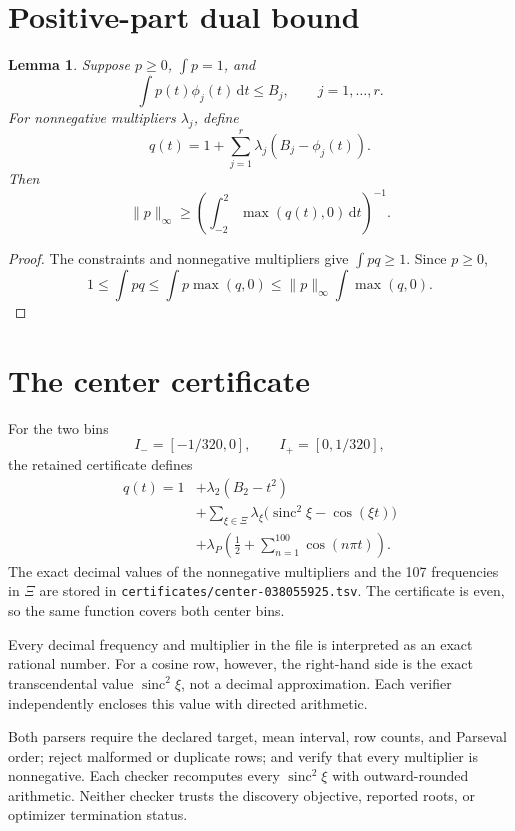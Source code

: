 \documentclass[11pt]{article}
\newtheorem{lemma}{Lemma}
\newcommand{\dd}{\,\mathrm{d}}
\DeclareMathOperator{\sinc}{sinc}
\begin{document}
\section{Positive-part dual bound}

\begin{lemma}\label{lem:dual}
Suppose $p\ge0$, $\int p=1$, and
\[
  \int p(t)\phi_j(t)\dd t\le B_j,\qquad j=1,\ldots,r.
\]
For nonnegative multipliers $\lambda_j$, define
\[
  q(t)=1+\sum_{j=1}^{r}\lambda_j(B_j-\phi_j(t)).
\]
Then
\[
  \|p\|_\infty\ge
  \left(\int_{-2}^{2}\max(q(t),0)\dd t\right)^{-1}.
\]
\end{lemma}

\begin{proof}
The constraints and nonnegative multipliers give $\int pq\ge1$. Since $p\ge0$,
\[
  1\le\int pq\le\int p\max(q,0)
  \le\|p\|_\infty\int\max(q,0).
\]
\end{proof}

\section{The center certificate}

For the two bins
\[
  I_-=[-1/320,0],\qquad I_+=[0,1/320],
\]
the retained certificate defines
\begin{align*}
q(t)=1
&+\lambda_2(B_2-t^2)\\
&+\sum_{\xi\in\Xi}
  \lambda_\xi\bigl(\sinc^2\xi-\cos(\xi t)\bigr)\\
&+\lambda_P\left(\frac12+\sum_{n=1}^{100}\cos(n\pi t)\right).
\end{align*}
The exact decimal values of the nonnegative multipliers and the 107
frequencies in $\Xi$ are stored in
\texttt{certificates/center-038055925.tsv}. The certificate is even, so the
same function covers both center bins.

Every decimal frequency and multiplier in the file is interpreted as an
exact rational number. For a cosine row, however, the right-hand side is the
exact transcendental value $\sinc^2\xi$, not a decimal approximation. Each
verifier independently encloses this value with directed arithmetic.

Both parsers require the declared target, mean interval, row counts, and
Parseval order; reject malformed or duplicate rows; and verify that every
multiplier is nonnegative. Each checker recomputes every $\sinc^2\xi$ with
outward-rounded arithmetic. Neither checker trusts the discovery objective,
reported roots, or optimizer termination status.
\end{document}
